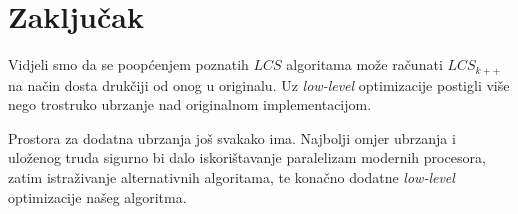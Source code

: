\documentclass[times, utf8, seminar, numeric]{fer}
\begin{document}
\chapter{Zaključak}
Vidjeli smo da se poopćenjem poznatih $LCS$ algoritama može 
računati $LCS_{k++}$ na način dosta drukčiji od onog u originalu.
Uz \emph{low-level} optimizacije postigli više nego trostruko ubrzanje
nad originalnom implementacijom.

Prostora za dodatna ubrzanja još svakako ima. Najbolji omjer ubrzanja
i uloženog truda sigurno bi dalo iskorištavanje paralelizam modernih
procesora, zatim istraživanje alternativnih algoritama, te konačno
dodatne \emph{low-level} optimizacije našeg algoritma.



\end{document}
